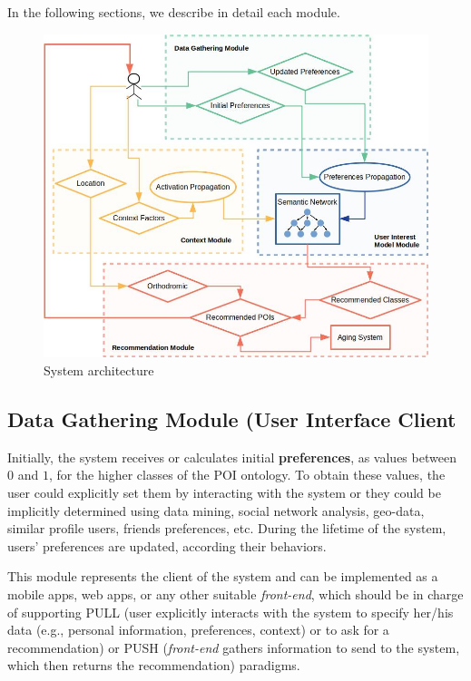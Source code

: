       
In the following sections, we describe in detail each module.


\begin{figure}[h]
\centering
\includegraphics[scale=0.4]{draws/arquitecture.jpg}
\caption{System architecture}
\label{fig:arquitecture}
\end{figure}

\subsection{Data Gathering Module (User Interface Client}
Initially, the system receives or calculates
initial \textbf{preferences}, as 
values between $0$ and $1$, for the higher classes of the POI ontology. To obtain these values, the user could explicitly set them by interacting with the system or they could be implicitly determined using data mining, social network analysis, geo-data, similar profile users, friends preferences, etc. During the lifetime of the system, users' preferences are updated, according their behaviors. 

This module represents the client of the system and can be implemented as a mobile apps, web apps, or any other suitable \textit{front-end}, which should be in charge of supporting PULL (user explicitly interacts with the system to specify her/his data (e.g., personal information, preferences, context) or to ask for a recommendation) or PUSH (\textit{front-end} gathers information to send to the system, which then returns the recommendation) paradigms.


